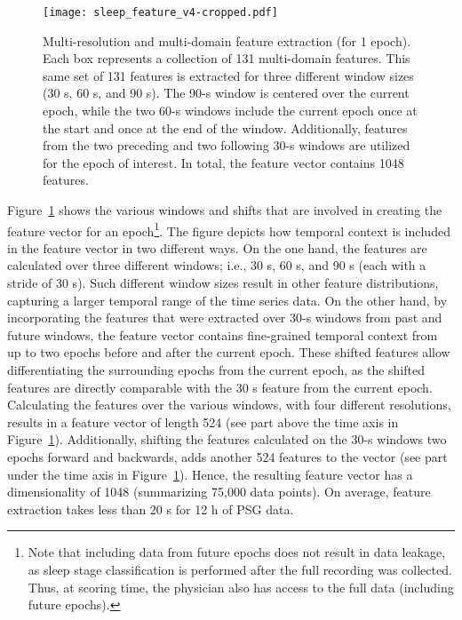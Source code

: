 \documentclass[runningheads]{llncs}
\begin{document}
\begin{figure}[htb]
    \centering
    \texttt{[image: sleep\_feature\_v4-cropped.pdf]}
    \caption{Multi-resolution and multi-domain feature extraction (for 1 epoch). Each box represents a collection of 131 multi-domain features. This same set of 131 features is extracted for three different window sizes (30 s, 60 s, and 90 s). The 90-s window is centered over the current epoch, while the two 60-s windows include the current epoch once at the start and once at the end of the window. 
    Additionally, features from the two preceding and two following 30-s windows are utilized for the epoch of interest.
In total, the feature vector contains 1048 features.
    }
    \label{fig:feat_extract_windows}
\end{figure}

Figure~\ref{fig:feat_extract_windows} shows the various windows and shifts that are involved in creating the feature vector for an epoch\footnote{Note that including data from future epochs does not result in data leakage, as sleep stage classification is performed after the full recording was collected. Thus, at scoring time, the physician also has access to the full data (including future epochs).}.
The figure depicts how temporal context is included in the feature vector in two different ways.
On the one hand, the features are calculated over three different windows; i.e., 30 s, 60 s, and 90 s (each with a stride of 30 s). Such different window sizes result in other feature distributions, capturing a larger temporal range of the time series data. 
On the other hand, by incorporating the features that were extracted over 30-s windows from past and future windows, the feature vector contains fine-grained temporal context from up to two epochs before and after the current epoch. These shifted features allow differentiating the surrounding epochs from the current epoch, as the shifted features are directly comparable with the 30 s feature from the current epoch.
Calculating the features over the various windows, with four different resolutions, results in a feature vector of length 524 (see part above the time axis in Figure~\ref{fig:feat_extract_windows}). Additionally, shifting the features calculated on the 30-s windows two epochs forward and backwards, adds another 524 features to the vector (see part under the time axis in Figure~\ref{fig:feat_extract_windows}). Hence, the resulting feature vector has a dimensionality of 1048 (summarizing 75,000 data points). On average, feature extraction takes less than 20 s for 12 h of PSG data.
\end{document}
